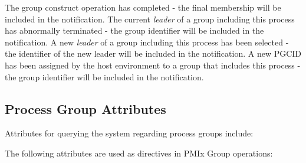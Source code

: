 \begin{constantdesc}
The group construct operation has completed - the final membership will be included in the notification.
%
The current \emph{leader} of a group including this process has abnormally terminated - the group identifier will be included in the notification.
%
A new \emph{leader} of a group including this process has been selected - the identifier of the new leader will be included in the notification.
%
A new \ac{PGCID} has been assigned by the host environment to a group that includes this process - the group identifier will be included in the notification.
%
\end{constantdesc}

\subsection{Process Group Attributes}

Attributes for querying the system regarding process groups include:

%
%
%
%

\vspace{\baselineskip}
The following attributes are used as directives in \ac{PMIx} Group operations:


